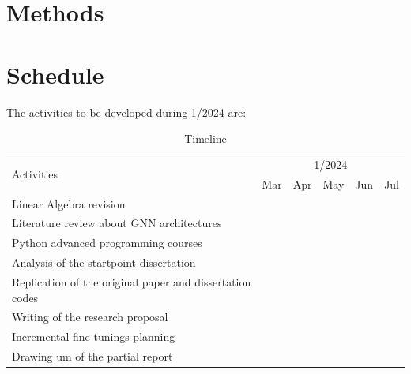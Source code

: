 \documentclass[12pt, a4paper, twoside]{article}
\numberwithin{equation}{subsection} %
\begin{document}
\newpage

\section{Methods}\label{methods}

\newpage

\section{Schedule}\label{schedule}

The activities to be developed during 1/2024 are:

         \begin{table}[H]
         \centering
         \footnotesize
         \caption{Timeline}
             \begin{tabular}{|l|c|c|c|c|c|} \hline
                 \multirow{2}{*}{Activities} & \multicolumn{5}{c|}{1/2024} \\ \cline{2-6}
                   & Mar & Apr & May & Jun & Jul \\ \hline

              Linear Algebra revision     & \cellcolor{midgray} & \cellcolor{midgray} & \cellcolor{midgray} & \cellcolor{midgray} & \\ \hline

              
              Literature review about GNN architectures  & \cellcolor{midgray}  & \cellcolor{midgray} & \cellcolor{midgray} &  &  \\ \hline

              Python advanced programming courses     & & \cellcolor{midgray} & \cellcolor{midgray} & \cellcolor{midgray} & \cellcolor{midgray} \\ \hline

              Analysis of the startpoint dissertation  &  &  & \cellcolor{midgray}& \cellcolor{midgray} & \cellcolor{midgray}\\ \hline

                Replication of the original paper and dissertation codes  &  &  &  & \cellcolor{midgray} & \cellcolor{midgray}\\ \hline

              
             Writing of the research proposal  & & & \cellcolor{midgray} & \cellcolor{midgray} & \cellcolor{midgray} \\ \hline

                Incremental fine-tunings planning  & & & & & \cellcolor{midgray} \\ \hline

                 Drawing um of the partial report   & & & & & \cellcolor{midgray} \\ \hline
             \end{tabular}
         \end{table}
\end{document}
